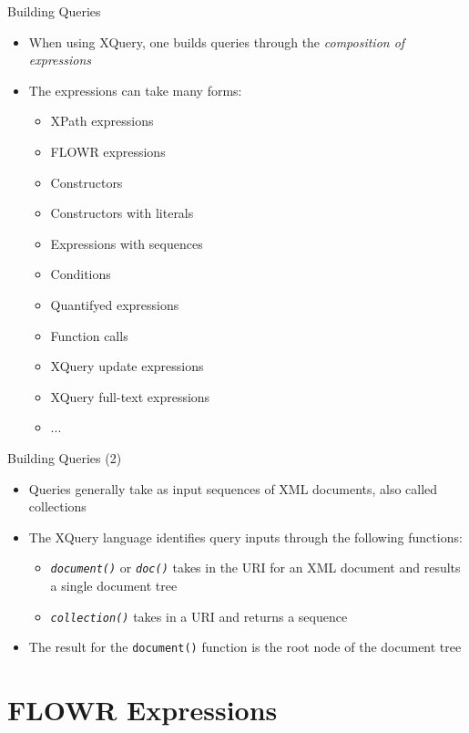 \documentclass[svgnames]{beamer}
\begin{document}
\begin{frame}[fragile]{Building Queries}
\begin{itemize}
\item When using XQuery, one builds queries through the \emph{composition of expressions}
\item The expressions can take many forms:
\begin{itemize}
	\item  XPath expressions
	\item  FLOWR expressions
	\item  Constructors
	\item  Constructors with literals
	\item  Expressions with sequences
	\item  Conditions
	\item  Quantifyed expressions
	\item  Function calls
	\item  XQuery update expressions
	\item  XQuery full-text expressions
	\item  ...
\end{itemize}
\end{itemize}
\end{frame}

\begin{frame}[fragile]{Building Queries (2)}
\begin{itemize}
\item Queries generally take as input sequences of XML documents, also called collections
\item The XQuery language identifies query inputs through the following functions:
\begin{itemize}
	\item \emph{\tt document()} or \emph{\tt doc()} takes in the URI for an XML document and results a single document tree
	\item \emph{\tt collection()} takes in a URI and returns a sequence
\end{itemize}
\item The result for the {\tt document()} function is the root node of the document tree
\end{itemize}
\end{frame}

\section{FLOWR Expressions}
\end{document}
